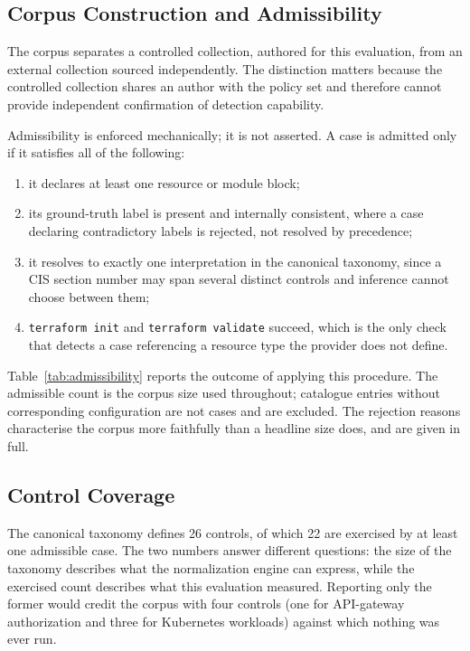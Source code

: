 \documentclass[journal]{IEEEtran}
\newcommand{\resulttable}[1]{%
  \IfFileExists{../results/tables/#1.tex}%
    {}%
    {\begin{table}[!t]\centering\small
       \fbox{\parbox{0.9\columnwidth}{\centering
         \texttt{\detokenize{results/tables/#1.tex}} not found.\\[2pt]
         Run \texttt{experiments/run\_baselines.sh} to generate it.}}%
     \end{table}}}
\renewcommand{\resulttable}[1]{}
\begin{document}
\subsection{Corpus Construction and Admissibility}
\label{sec:corpus}
\label{sec:admissibility}
The corpus separates a controlled collection, authored for this evaluation, from
an external collection sourced independently. The distinction matters because the
controlled collection shares an author with the policy set and therefore cannot
provide independent confirmation of detection capability.

Admissibility is enforced mechanically; it is not asserted. A case is admitted
only if it satisfies all of the following:
\begin{enumerate}
\item it declares at least one resource or module block;
\item its ground-truth label is present and internally consistent, where a case
declaring contradictory labels is rejected, not resolved by precedence;
\item it resolves to exactly one interpretation in the canonical taxonomy, since
a CIS section number may span several distinct controls and inference cannot
choose between them;
\item \texttt{terraform init} and \texttt{terraform validate} succeed, which is
the only check that detects a case referencing a resource type the provider does
not define.
\end{enumerate}

\resulttable{corpus}

Table~\ref{tab:admissibility} reports the outcome of applying this procedure. The
admissible count is the corpus size used throughout; catalogue entries without
corresponding configuration are not cases and are excluded. The rejection reasons characterise the corpus more faithfully than a headline
size does, and are given in full.

\subsection{Control Coverage}
\label{sec:coverage}
The canonical taxonomy defines 26 controls, of which 22 are exercised by at least
one admissible case. The two numbers answer different questions: the size of the
taxonomy describes what the normalization engine can express, while the exercised
count describes what this evaluation measured. Reporting only the former
would credit the corpus with four controls (one for API-gateway authorization and
three for Kubernetes workloads) against which nothing was ever run.
\end{document}
